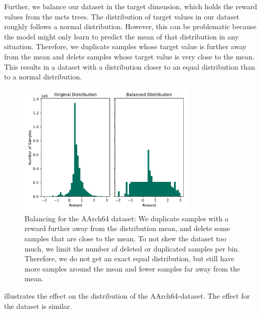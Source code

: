 Further, we balance our dataset in the target dimension, which holds the reward values from the \ac{mcts} trees.
The distribution of target values in our dataset roughly follows a normal distribution.
However, this can be problematic because the model might only learn to predict the mean of that distribution in any situation.
Therefore, we duplicate samples whose target value is further away from the mean and delete samples whose target value is very close to the mean.
This results in a dataset with a distribution closer to an equal distribution than to a normal distribution.
\begin{figure}
    \centering
    \includegraphics[width=0.75\textwidth]{img/balanced-supervised-dataset-rpi.pdf}
    \caption[Balancing for the AArch64 Dataset]{Balancing for the AArch64 dataset: 
    We duplicate samples with a reward further away from the distribution mean, and delete some samples that are close to the mean.
    To not skew the dataset too much, we limit the number of deleted or duplicated samples per bin.
    Therefore, we do not get an exact equal distribution, but still have more samples around the mean and fewer samples far away from the mean.
    }
    \label{fig:eval:balanced-dataset}
\end{figure}
 illustrates the effect on the distribution of the AArch64-dataset.
The effect for the \aurora{} dataset is similar.

